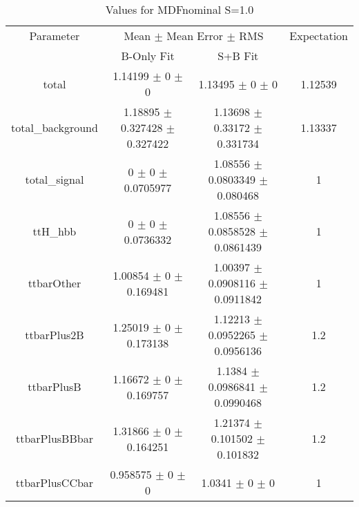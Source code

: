 \begin{table}
\centering
\caption{Values for MDFnominal S=1.0}
\begin{tabular}{cccc}
\toprule
Parameter & \multicolumn{2}{c}{Mean $\pm$ Mean Error $\pm$ RMS} & Expectation\\
 & B-Only Fit & S+B Fit & \\
\midrule
total & \num{1.14199} $\pm$ \num{0} $\pm$ \num{0} & \num{1.13495} $\pm$ \num{0} $\pm$ \num{0} & \num{1.12539}\\
total\_background & \num{1.18895} $\pm$ \num{0.327428} $\pm$ \num{0.327422} & \num{1.13698} $\pm$ \num{0.33172} $\pm$ \num{0.331734} & \num{1.13337}\\
total\_signal & \num{0} $\pm$ \num{0} $\pm$ \num{0.0705977} & \num{1.08556} $\pm$ \num{0.0803349} $\pm$ \num{0.080468} & \num{1}\\
ttH\_hbb & \num{0} $\pm$ \num{0} $\pm$ \num{0.0736332} & \num{1.08556} $\pm$ \num{0.0858528} $\pm$ \num{0.0861439} & \num{1}\\
ttbarOther & \num{1.00854} $\pm$ \num{0} $\pm$ \num{0.169481} & \num{1.00397} $\pm$ \num{0.0908116} $\pm$ \num{0.0911842} & \num{1}\\
ttbarPlus2B & \num{1.25019} $\pm$ \num{0} $\pm$ \num{0.173138} & \num{1.12213} $\pm$ \num{0.0952265} $\pm$ \num{0.0956136} & \num{1.2}\\
ttbarPlusB & \num{1.16672} $\pm$ \num{0} $\pm$ \num{0.169757} & \num{1.1384} $\pm$ \num{0.0986841} $\pm$ \num{0.0990468} & \num{1.2}\\
ttbarPlusBBbar & \num{1.31866} $\pm$ \num{0} $\pm$ \num{0.164251} & \num{1.21374} $\pm$ \num{0.101502} $\pm$ \num{0.101832} & \num{1.2}\\
ttbarPlusCCbar & \num{0.958575} $\pm$ \num{0} $\pm$ \num{0} & \num{1.0341} $\pm$ \num{0} $\pm$ \num{0} & \num{1}\\
\bottomrule
\end{tabular}
\end{table}